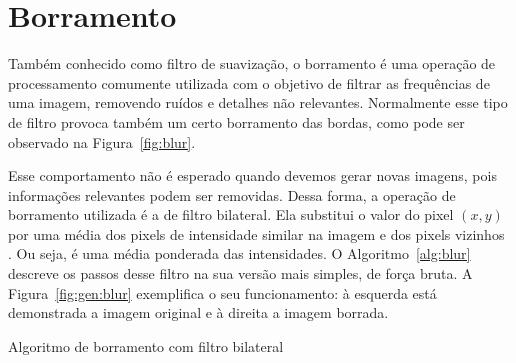 
\section{Borramento}

Também conhecido como filtro de suavização, o borramento é uma operação de processamento comumente utilizada com o objetivo de filtrar as frequências de uma imagem, removendo ruídos e detalhes não relevantes. Normalmente esse tipo de filtro provoca também um certo borramento das bordas, como pode ser observado na Figura~\ref{fig:blur}.

Esse comportamento não é esperado quando devemos gerar novas imagens, pois informações relevantes podem ser removidas. Dessa forma, a operação de borramento utilizada é a de filtro bilateral. Ela substitui o valor do pixel $(x,y)$ por uma média dos pixels de intensidade similar na imagem e dos pixels vizinhos \cite{Tomasi1998}. Ou seja, é uma média ponderada das intensidades. O Algoritmo~\ref{alg:blur} descreve os passos desse filtro na sua versão mais simples, de força bruta. A Figura~\ref{fig:gen:blur} exemplifica o seu funcionamento: à esquerda está demonstrada a imagem original e à direita a imagem borrada.

\vspace{0.5cm}
\begin{algorithm}[!htbp]
  \caption{Algoritmo de borramento com filtro bilateral}
  \label{alg:blur}
  \SetAlgoLined


\end{algorithm}
\vspace{0.5cm}

